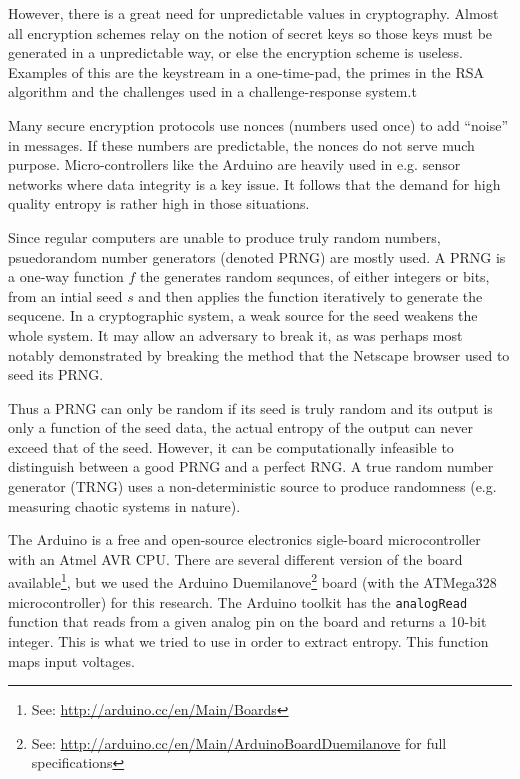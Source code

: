 \documentclass[a4paper]{article}           %
\begin{document}
However, there is a great need for unpredictable values in cryptography. Almost all encryption schemes relay on the notion of secret keys so those keys must be generated in a unpredictable way, or else the encryption scheme is useless. Examples of this are the keystream in a one-time-pad, the primes in the RSA algorithm and the challenges used in a challenge-response system\cite{menezes1996,anthes2011}.t

Many secure encryption protocols use nonces (numbers used once) to add ``noise'' in messages\cite{anthes2011}. If these numbers are predictable, the nonces do not serve much purpose. Micro-controllers like the Arduino are heavily used in e.g. sensor networks\cite{tsense} where data integrity is a key issue. It follows that the demand for high quality entropy is rather high in those situations. 

Since regular computers are unable to produce truly random numbers, psuedorandom number generators (denoted PRNG) are mostly used. A PRNG is a one-way function $f$ the generates random sequnces, of either integers or bits, from an intial seed $s$ and then applies the function iteratively to generate the sequcene\cite{menezes1996}. In a cryptographic system, a weak source for the seed weakens the whole system. It may allow an adversary to break it, as was perhaps most notably demonstrated by breaking the method that the Netscape browser used to seed its PRNG\cite{netscape}. 

Thus a PRNG can only be random if its seed is truly random and its output is only a function of the seed data, the actual entropy of the output can never exceed that of the seed. However, it can be computationally infeasible to distinguish between a good PRNG and a perfect RNG. A true random number generator (TRNG) uses a non-deterministic source to produce randomness (e.g. measuring chaotic systems in nature). 

The Arduino is a free and open-source electronics sigle-board microcontroller with an Atmel AVR CPU. There are several different version of the board available\footnote{See: \url{http://arduino.cc/en/Main/Boards}}, but we used the Arduino Duemilanove\footnote{See: \url{http://arduino.cc/en/Main/ArduinoBoardDuemilanove} for full specifications} board (with the ATMega328\cite{atmegads} microcontroller) for this research. The Arduino toolkit has the \texttt{analogRead} function that reads from a given analog pin on the board and returns a 10-bit integer. This is what we tried to use in order to extract entropy. This function maps input voltages. 
\end{document}
